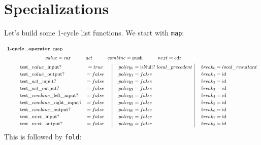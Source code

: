 \documentclass[twoside]{article}
\newcommand{\bfmbox}[1]{\mbox{\bfseries #1}}
\newcommand{\test}[1][\_]{\mbox{test#1}}
\newcommand{\vi}[1][\_]{\mbox{$value$#1input}}
\newcommand{\vo}[1][\_]{\mbox{$value$#1output}}
\newcommand{\ai}[1][\_]{\mbox{$act$#1input}}
\newcommand{\ao}[1][\_]{\mbox{$act$#1output}}
\newcommand{\cli}[1][\_]{\mbox{$combine$#1left#1input}}
\newcommand{\cri}[1][\_]{\mbox{$combine$#1right#1input}}
\newcommand{\co}[1][\_]{\mbox{$combine$#1output}}
\newcommand{\nei}[1][\_]{\mbox{$next$#1input}}
\newcommand{\no}[1][\_]{\mbox{$next$#1output}}
\newcommand{\locr}[1][\_]{local#1resultant}
\newcommand{\locp}[1][\_]{local#1precedent}
\newcommand{\tab}[1][1.125cm]{\hspace{#1}}
\newcommand{\col}[1][0ex]{& \hspace{#1}}
\newcommand{\id}{\mbox{id}}
\newcommand{\car}{\mbox{car}}
\newcommand{\cdr}{\mbox{cdr}}
\newcommand{\isNull}{\mbox{isNull?}}
\newcommand{\push}{\mbox{push}}
\begin{document}

\section*{Specializations}

Let's build some 1-cycle list functions. We start with \texttt{map}:

$$ \def\arraystretch{1.2}
\small
\tab[0.5cm] \begin{array}{llcl|l|l}
\multicolumn{5}{l}{\tab[-0.5cm] \bfmbox{1-cycle\_operator}\ \ \mbox{map}}							\\[1ex]
\multicolumn{5}{l}{\tab[2cm] value = \car \tab[1cm] act \tab[1cm] combine = \push \tab[1cm] next = \cdr}			\\[1ex]
	& \test\vi?	& = true	&\col[0.25cm] policy_{0} = \isNull\ \locp	\col[0.25cm] break_{0} = \locr		\\
	& \test\vo?	& = false	&\col[0.25cm] policy_{1} = false			\col[0.25cm] break_{1} = \id	\\
	& \test\ai?	& = false	&\col[0.25cm] policy_{2} = false			\col[0.25cm] break_{2} = \id	\\
	& \test\ao?	& = false	&\col[0.25cm] policy_{3} = false			\col[0.25cm] break_{3} = \id	\\
	& \test\cli?	& = false	&\col[0.25cm] policy_{4} = false			\col[0.25cm] break_{4} = \id	\\
	& \test\cri?	& = false	&\col[0.25cm] policy_{5} = false			\col[0.25cm] break_{5} = \id	\\
	& \test\co? 	& = false	&\col[0.25cm] policy_{6} = false			\col[0.25cm] break_{6} = \id	\\
	& \test\nei?	& = false	&\col[0.25cm] policy_{7} = false			\col[0.25cm] break_{7} = \id	\\
	& \test\no? 	& = false	&\col[0.25cm] policy_{8} = false			\col[0.25cm] break_{8} = \id
\end{array} $$
This is followed by \texttt{fold}:
\end{document}
